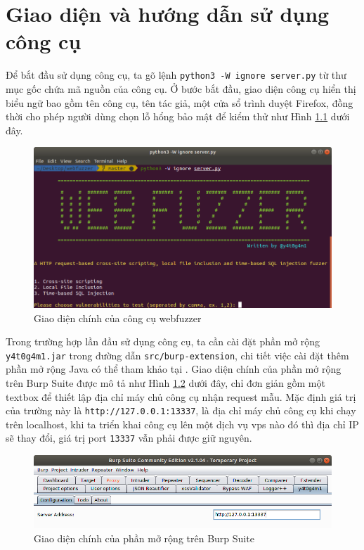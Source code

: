 \cleardoublepage

\appendix
\chapter{Giao diện và hướng dẫn sử dụng công cụ}
Để bắt đầu sử dụng công cụ, ta gõ lệnh \texttt{python3 -W ignore server.py} từ thư mục gốc chứa mã nguồn của công cụ. Ở bước bắt đầu, giao diện công cụ hiển thị biểu ngữ bao gồm tên công cụ, tên tác giả, một cửa sổ trình duyệt Firefox, đồng thời cho phép người dùng chọn lỗ hổng bảo mật để kiểm thử như Hình \ref{fig:main-server-interface} dưới đây.
\begin{figure}[H]
  \centering
    \includegraphics[width=\textwidth,keepaspectratio=true]{images/main-server-interface.png}
  \caption{Giao diện chính của công cụ webfuzzer}
  \label{fig:main-server-interface}
\end{figure}
Trong trường hợp lần đầu sử dụng công cụ, ta cần cài đặt phần mở rộng \texttt{y4t0g4m1.jar} trong đường dẫn \texttt{src/burp-extension}, chi tiết việc cài đặt thêm phần mở rộng Java có thể tham khảo tại \parencite{burp-suite-extension-setup}. Giao diện chính của phần mở rộng trên Burp Suite được mô tả như Hình \ref{fig:main-burp-extension-interface} dưới đây, chỉ đơn giản gồm một textbox để thiết lập địa chỉ máy chủ công cụ nhận request mẫu. Mặc định giá trị của trường này là \texttt{http://127.0.0.1:13337}, là địa chỉ máy chủ công cụ khi chạy trên localhost, khi ta triển khai công cụ lên một dịch vụ vps nào đó thì địa chỉ IP sẽ thay đổi, giá trị port \texttt{13337} vẫn phải được giữ nguyên. 
\begin{figure}[H]
  \centering
    \includegraphics[width=\textwidth,keepaspectratio=true]{images/main-burp-extension-interface.png}
  \caption{Giao diện chính của phần mở rộng trên Burp Suite}
  \label{fig:main-burp-extension-interface}
\end{figure}
